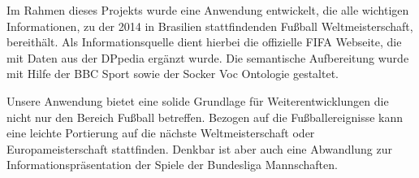 \documentclass[runningheads,a4paper]{llncs}
\begin{document}
Im Rahmen dieses Projekts wurde eine Anwendung entwickelt, die alle wichtigen Informationen, zu der 2014 in Brasilien stattfindenden Fußball Weltmeisterschaft, bereithält. Als Informationsquelle dient hierbei die offizielle FIFA Webseite, die mit Daten aus der DPpedia ergänzt wurde. Die semantische Aufbereitung wurde mit Hilfe der BBC Sport sowie der Socker Voc Ontologie gestaltet.  

Unsere Anwendung bietet eine solide Grundlage für Weiterentwicklungen die nicht nur den Bereich Fußball betreffen. Bezogen auf die Fußballereignisse kann eine leichte Portierung auf die nächste Weltmeisterschaft oder Europameisterschaft stattfinden. Denkbar ist aber auch eine Abwandlung zur Informationspräsentation der Spiele der Bundesliga Mannschaften. 
\end{document}
